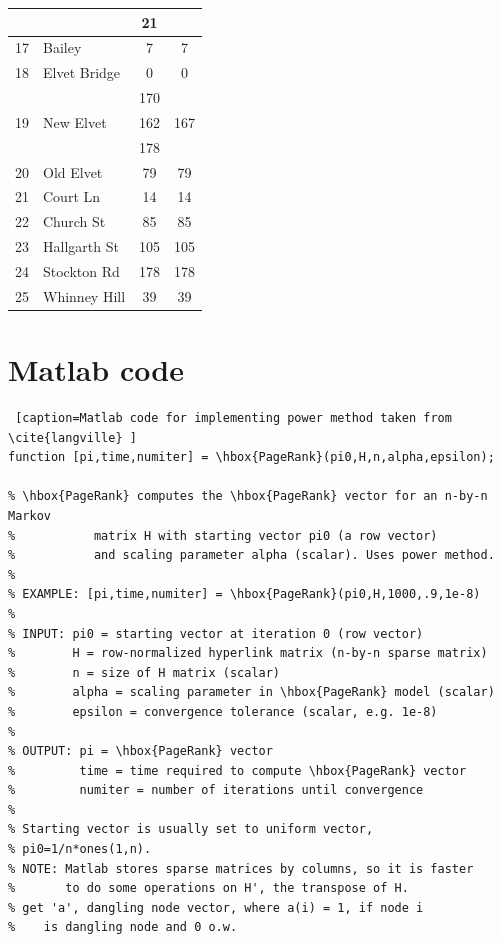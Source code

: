 \documentclass[11pt]{report}
\begin{document}
\begin{appendices}
\begin{table}[h]
\begin{tabular} {r l| c |c}
 &&21\\
 \hline
 17& Bailey&7&7\\
 \hline
 18 & Elvet Bridge&0&0\\
 \hline
 \multirow{3}{*}{19}&\multirow{3}{*}{New Elvet}&170&\multirow{3}{*}{167}\\
 &&162\\
 &&178\\
 \hline
 20 & Old Elvet&79&79\\
 \hline
 21 & Court Ln&14&14\\
 \hline
 22 & Church St&85&85\\
 \hline
 23 &Hallgarth St&105&105\\
 \hline
 24 & Stockton Rd&178&178\\
 \hline
 25 & Whinney Hill&39&39\\ 
 \end{tabular}
 \label{tble:Durham cars}
\end{table}



\chapter{Matlab code} \label{app:code}

\begin{lstlisting} [caption=Matlab code for implementing power method taken from \cite{langville} ]
function [pi,time,numiter] = \hbox{PageRank}(pi0,H,n,alpha,epsilon);

% \hbox{PageRank} computes the \hbox{PageRank} vector for an n-by-n Markov
%           matrix H with starting vector pi0 (a row vector)
%           and scaling parameter alpha (scalar). Uses power method.
%
% EXAMPLE: [pi,time,numiter] = \hbox{PageRank}(pi0,H,1000,.9,1e-8)
%
% INPUT: pi0 = starting vector at iteration 0 (row vector)
%        H = row-normalized hyperlink matrix (n-by-n sparse matrix)
%        n = size of H matrix (scalar)
%        alpha = scaling parameter in \hbox{PageRank} model (scalar)
%        epsilon = convergence tolerance (scalar, e.g. 1e-8)
%
% OUTPUT: pi = \hbox{PageRank} vector
%         time = time required to compute \hbox{PageRank} vector
%         numiter = number of iterations until convergence
%        
% Starting vector is usually set to uniform vector,
% pi0=1/n*ones(1,n).
% NOTE: Matlab stores sparse matrices by columns, so it is faster
%       to do some operations on H', the transpose of H.
% get 'a', dangling node vector, where a(i) = 1, if node i 
%    is dangling node and 0 o.w.


\end{lstlisting}
\end{appendices}
\end{document}
